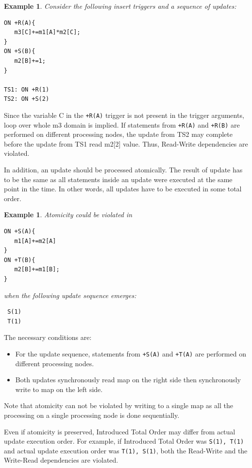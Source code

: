\documentclass{sig-semester}
\newtheorem{example}[theorem]{Example}
\def\EXORD{actual update execution order\xspace}
\begin{document}
\begin{example} \em
\label{ex:foreachTrigger}
Consider the following insert triggers and a sequence of updates:
\begin{verbatim}
ON +R(A){
   m3[C]+=m1[A]*m2[C];
}
ON +S(B){
   m2[B]+=1;
}

TS1: ON +R(1)
TS2: ON +S(2)
\end{verbatim}
\end{example}

Since the variable C in the \texttt{+R(A)} trigger is not present in the trigger arguments, loop over whole m3 domain is implied. If statements from \texttt{+R(A)} and \texttt{+R(B)} are performed on different processing nodes, the update from TS2 may complete before the update from TS1 read m2[2] value. Thus, Read-Write dependencies are violated.

In addition, an update should be processed atomically. The result of update has to be the same as all statements inside an update were executed at the same point in the time. In other words, all updates have to be executed in some total order.

\begin{example} \em
\label{ex:mulInput}
Atomicity could be violated in
\begin{verbatim}
ON +S(A){
   m1[A]+=m2[A]
}
ON +T(B){
   m2[B]+=m1[B];
}\end{verbatim}
when the following update sequence emerges:
\begin{verbatim}
 S(1)
 T(1)
\end{verbatim}
\end{example}
The necessary conditions are:
\begin{itemize}
 \item For the update sequence, statements from \texttt{+S(A)} and \texttt{+T(A)} are performed on different processing nodes.
 \item Both updates synchronously read map on the right side then synchronously write to map on the left side. 
\end{itemize}

Note that atomicity can not be violated by writing to a single map as all the processing on a single processing node is done sequentially.

Even if atomicity is preserved, Introduced Total Order may differ from \EXORD. For example, if Introduced Total Order was \texttt{S(1), T(1)} and \EXORD was \texttt{T(1), S(1)}, both the Read-Write and the Write-Read dependencies are violated.
\end{document}
